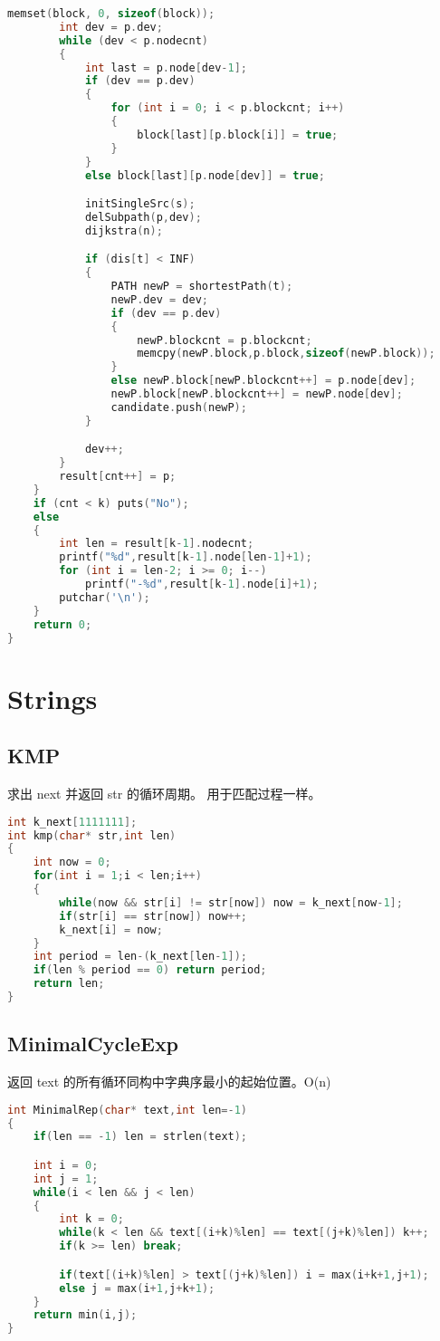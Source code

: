 \begin{lstlisting}[language=C++]
		memset(block, 0, sizeof(block));
		int dev = p.dev;
		while (dev < p.nodecnt)
		{
			int last = p.node[dev-1];
			if (dev == p.dev)
			{
				for (int i = 0; i < p.blockcnt; i++)
				{
					block[last][p.block[i]] = true;
				}
			}
			else block[last][p.node[dev]] = true;

			initSingleSrc(s);
			delSubpath(p,dev);
			dijkstra(n);

			if (dis[t] < INF)
			{
				PATH newP = shortestPath(t);
				newP.dev = dev;
				if (dev == p.dev)
				{
					newP.blockcnt = p.blockcnt;
					memcpy(newP.block,p.block,sizeof(newP.block));
				}
				else newP.block[newP.blockcnt++] = p.node[dev];
				newP.block[newP.blockcnt++] = newP.node[dev];
				candidate.push(newP);
			}

			dev++;
		}
		result[cnt++] = p;
	}
	if (cnt < k) puts("No");
	else
	{
		int len = result[k-1].nodecnt;
		printf("%d",result[k-1].node[len-1]+1);
		for (int i = len-2; i >= 0; i--)
			printf("-%d",result[k-1].node[i]+1);
		putchar('\n');
	}
	return 0;
}
\end{lstlisting}

\section{Strings}
\subsection{KMP}
 求出 next 并返回 str 的循环周期。 用于匹配过程一样。
\begin{lstlisting}[language=C++]
int k_next[1111111];
int kmp(char* str,int len)
{
	int now = 0;
	for(int i = 1;i < len;i++)
	{
		while(now && str[i] != str[now]) now = k_next[now-1];
		if(str[i] == str[now]) now++;
		k_next[i] = now;
	}
	int period = len-(k_next[len-1]);
	if(len % period == 0) return period;
	return len;
}
\end{lstlisting}
\subsection{MinimalCycleExp}
 返回 text 的所有循环同构中字典序最小的起始位置。O(n) 
\begin{lstlisting}[language=C++]
int MinimalRep(char* text,int len=-1)
{
	if(len == -1) len = strlen(text);

	int i = 0;
	int j = 1;
	while(i < len && j < len)
	{
		int k = 0;
		while(k < len && text[(i+k)%len] == text[(j+k)%len]) k++;
		if(k >= len) break;

		if(text[(i+k)%len] > text[(j+k)%len]) i = max(i+k+1,j+1);
		else j = max(i+1,j+k+1);
	}
	return min(i,j);
}
\end{lstlisting}
